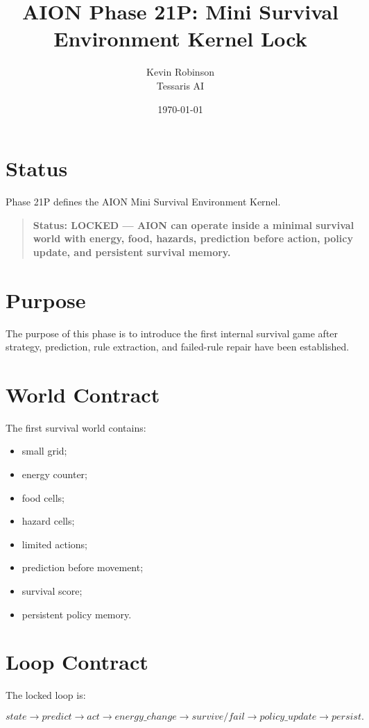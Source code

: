 \documentclass[11pt,a4paper]{article}
\title{\textbf{AION Phase 21P: Mini Survival Environment Kernel Lock}}
\author{Kevin Robinson\\Tessaris AI}
\date{\today}
\begin{document}
\maketitle

\section{Status}

Phase 21P defines the AION Mini Survival Environment Kernel.

\begin{quote}
\textbf{Status: LOCKED --- AION can operate inside a minimal survival world with energy, food, hazards, prediction before action, policy update, and persistent survival memory.}
\end{quote}

\section{Purpose}

The purpose of this phase is to introduce the first internal survival game after strategy, prediction, rule extraction, and failed-rule repair have been established.

\section{World Contract}

The first survival world contains:

\begin{itemize}
  \item small grid;
  \item energy counter;
  \item food cells;
  \item hazard cells;
  \item limited actions;
  \item prediction before movement;
  \item survival score;
  \item persistent policy memory.
\end{itemize}

\section{Loop Contract}

The locked loop is:

\[
state \rightarrow predict \rightarrow act \rightarrow energy\_change
\rightarrow survive/fail \rightarrow policy\_update \rightarrow persist.
\]
\end{document}
